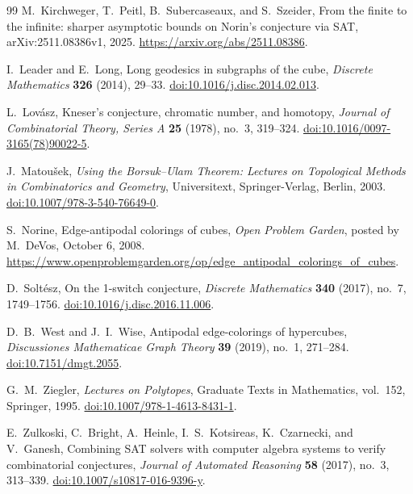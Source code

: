 \documentclass[reqno,12pt]{amsart}
\theoremstyle{definition}
\begin{document}
\begin{thebibliography}{99}
M.~Kirchweger, T.~Peitl, B.~Subercaseaux, and S.~Szeider,
From the finite to the infinite: sharper asymptotic bounds on Norin's
conjecture via SAT,
arXiv:2511.08386v1, 2025.
\url{https://arxiv.org/abs/2511.08386}.

I.~Leader and E.~Long,
Long geodesics in subgraphs of the cube,
\emph{Discrete Mathematics} \textbf{326} (2014), 29--33.
\href{https://doi.org/10.1016/j.disc.2014.02.013}
{doi:10.1016/j.disc.2014.02.013}.

L.~Lov\'asz,
Kneser's conjecture, chromatic number, and homotopy,
\emph{Journal of Combinatorial Theory, Series A} \textbf{25} (1978),
no.~3, 319--324.
\href{https://doi.org/10.1016/0097-3165(78)90022-5}
{doi:10.1016/0097-3165(78)90022-5}.

J.~Matou\v{s}ek,
\emph{Using the Borsuk--Ulam Theorem:
Lectures on Topological Methods in Combinatorics and Geometry},
Universitext,
Springer-Verlag, Berlin, 2003.
\href{https://doi.org/10.1007/978-3-540-76649-0}
{doi:10.1007/978-3-540-76649-0}.

S.~Norine,
Edge-antipodal colorings of cubes,
\emph{Open Problem Garden}, posted by M.~DeVos, October 6, 2008.
\url{https://www.openproblemgarden.org/op/edge_antipodal_colorings_of_cubes}.

D.~Solt\'esz,
On the 1-switch conjecture,
\emph{Discrete Mathematics} \textbf{340} (2017),
no.~7, 1749--1756.
\href{https://doi.org/10.1016/j.disc.2016.11.006}
{doi:10.1016/j.disc.2016.11.006}.

D.~B.~West and J.~I.~Wise,
Antipodal edge-colorings of hypercubes,
\emph{Discussiones Mathematicae Graph Theory} \textbf{39} (2019),
no.~1, 271--284.
\href{https://doi.org/10.7151/dmgt.2055}{doi:10.7151/dmgt.2055}.

G.~M.~Ziegler,
\emph{Lectures on Polytopes},
Graduate Texts in Mathematics, vol.~152,
Springer, 1995.
\href{https://doi.org/10.1007/978-1-4613-8431-1}
{doi:10.1007/978-1-4613-8431-1}.

E.~Zulkoski, C.~Bright, A.~Heinle, I.~S.~Kotsireas,
K.~Czarnecki, and V.~Ganesh,
Combining SAT solvers with computer algebra systems to verify
combinatorial conjectures,
\emph{Journal of Automated Reasoning} \textbf{58} (2017),
no.~3, 313--339.
\href{https://doi.org/10.1007/s10817-016-9396-y}
{doi:10.1007/s10817-016-9396-y}.

\end{thebibliography}
\end{document}
